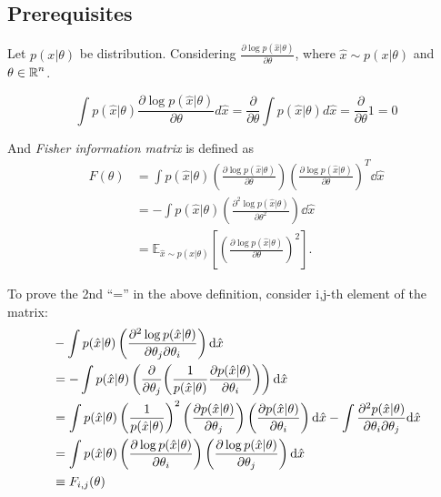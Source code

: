 \subsection{Prerequisites}

\begin{edefn}
    Let $p(x \vert \theta)$ be distribution. Considering $\frac{\partial \log p(\hat{x} | \theta)}{\partial \theta}$, where $\hat{x} \sim p(x | \theta)$ and $\theta \in \operatorname{\mathbb{R}}^n$.

    \begin{equation*}
        \int p(\hat{x} | \theta) \frac{\partial \log p(\hat{x} | \theta)}{\partial \theta} d\hat{x} = \frac{\partial}{\partial \theta} \int p(\hat{x} | \theta) d\hat{x} = \frac{\partial}{\partial \theta} 1 = 0
    \end{equation*}

    And \textit{Fisher information matrix} is defined as
    \begin{equation*}
        \begin{aligned}
            F(\theta) &= \int p(\hat{x} | \theta) \left( \frac{\partial \log p(\hat{x} | \theta)}{\partial \theta} \right) \left( \frac{\partial \log p(\hat{x} | \theta)}{\partial \theta} \right)^T \dd \hat{x} \\
                      &= -\int p(\hat{x} | \theta) \left( \frac{\partial^2 \log p(\hat{x} | \theta)}{\partial \theta^2} \right) \dd \hat{x} \\
                      &= \mathbb{E}_{\hat{x} \sim p(x | \theta)} \left[ \left( \frac{\partial \log p(\hat{x} | \theta)}{\partial \theta} \right)^2 \right].
        \end{aligned}
    \end{equation*}
\end{edefn}

To prove the 2nd ``='' in the above definition, consider i,j-th element of the matrix:
\begin{equation*}
    \begin{aligned}
        &-\int p(\hat{x} | \theta) \left( \pdv{\log p(\hat{x} | \theta)}{\theta_j}{\theta_i} \right) \dd \hat{x} \\
        &=-\int p(\hat{x} | \theta) \left( \pdv{\theta_j}(\frac{1}{p(\hat{x} | \theta)}\pdv{p(\hat{x} | \theta)}{\theta_i}) \right) \dd \hat{x} \\
        &=\int p(\hat{x} | \theta) \left(\frac{1}{p(\hat{x} | \theta)}\right)^2 \left(\pdv{p(\hat{x} | \theta)}{\theta_j}\right)\left(\pdv{p(\hat{x} | \theta)}{\theta_i}\right) \dd \hat{x}
          - \int \pdv{p(\hat{x} | \theta)}{\theta_i}{\theta_j} \dd \hat{x} \\
        &= \int p(\hat{x} | \theta) \left( \pdv{\log p(\hat{x} | \theta)}{\theta_i} \right) \left( \pdv{\log p(\hat{x} | \theta)}{\theta_j} \right) \dd \hat{x} \\
        &\equiv F_{i,j}(\theta)
    \end{aligned}
\end{equation*}

